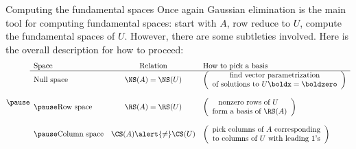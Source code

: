 \begin{frame}{Computing the fundamental spaces}
\footnotesize
Once again Gaussian elimination is the main tool for computing fundamental spaces: start with $A$, row reduce to $U$, compute the fundamental spaces of $U$. However, there are some subtleties involved. Here is the overall description for how to proceed:
\[
\pause 
\begin{array}{lcl}
\text{Space}&\text{Relation}&\text{How to pick a basis}\\
\hline
\text{Null space}&\NS(A)=\NS(U)&\left(\begin{array}{c}\text{find vector parametrization}\\ \text{of solutions to $U\boldx=\boldzero$} \end{array}\right) \\
\\
\pause\text{Row space}&\RS(A)=\RS(U) &\left(\begin{array}{c}\text{nonzero rows of $U$ }\\ \text{form a basis of $\RS(A)$} \end{array}\right) \\
\\
\pause\text{Column space}&\CS(A)\alert{\ne}\CS(U)&\left(\begin{array}{c}\text{pick columns of $A$ corresponding}\\ \text{to columns of $U$ with leading 1's} \end{array}\right) 
\end{array}
\]
\end{frame}
